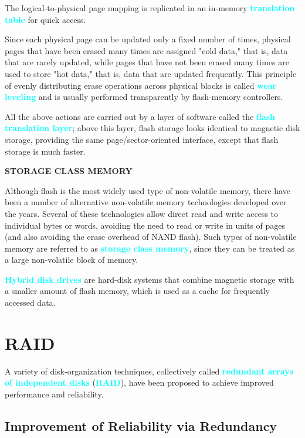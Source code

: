 \documentclass[a4paper,12pt,twoside,openany]{book}
\newcommand{\textcy}[1]{\textbf{\textcolor{cyan}{#1}}}
\begin{document}
The logical-to-physical page mapping is replicated in an in-memory \textcy{translation table} for quick access.

Since each physical page can be updated only a fixed number of times, physical pages that have been erased many times are assigned "cold data," that is, data that are rarely updated, while pages that have not been erased many times are used to store "hot data," that is, data that are updated frequently. This principle of evenly distributing erase operations across physical blocks is called \textcy{wear leveling} and is usually performed transparently by flash-memory controllers.

All the above actions are carried out by a layer of software called the \textcy{flash translation layer}; above this layer, flash storage looks identical to magnetic disk storage, providing the same page/sector-oriented interface, except that flash storage is much faster.

\begin{framed}
    \begin{center}
        {\textbf{STORAGE CLASS MEMORY}}
    \end{center}

    Although flash is the most widely used type of non-volatile memory, there have been a number of alternative non-volatile memory technologies developed over the years. Several of these technologies allow direct read and write access to individual bytes or words, avoiding the need to read or write in units of pages (and also avoiding the erase overhead of NAND flash). Such types of non-volatile memory are referred to as \textcy{storage class memory}, since they can be treated as a large non-volatile block of memory.
\end{framed}

\textcy{Hybrid disk drives} are hard-disk systems that combine magnetic storage with a smaller amount of flash memory, which is used as a cache for frequently accessed data.

\section{RAID}

A variety of disk-organization techniques, collectively called \textcy{redundant arrays of independent disks} (\textcy{RAID}), have been proposed to achieve improved performance and reliability.

\subsection{Improvement of Reliability via Redundancy}
\end{document}
